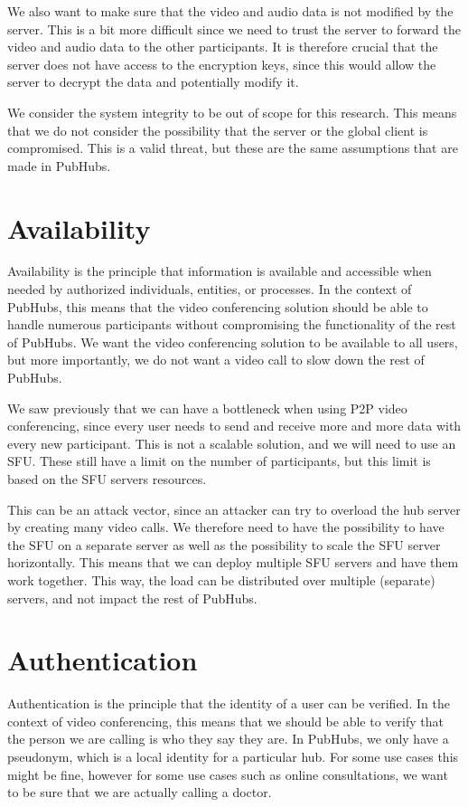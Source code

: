 \documentclass{report}
\begin{document}
We also want to make sure that the video and audio data is not modified by the server. This is a bit more difficult
since we need to trust the server to forward the video and audio data to the other participants. It is therefore crucial
that the server does not have access to the encryption keys, since this would allow the server to decrypt the data and
potentially modify it.

We consider the system integrity to be out of scope for this research. This means that we do not consider the
possibility that the server or the global client is compromised. This is a valid threat, but these are the same
assumptions
that are made in PubHubs.

\section{Availability}
Availability is the principle that information is available and accessible when needed by authorized individuals,
entities, or processes. In the context of PubHubs, this means that the video conferencing solution should be able to
handle numerous participants without compromising the functionality of the rest of PubHubs. We want the
video conferencing solution to be available to all users, but more importantly, we do not want a video call to slow
down the rest of PubHubs.

We saw previously that we can have a bottleneck when using P2P video conferencing, since every user needs to send
and receive more and more data with every new participant. This is not a scalable solution, and we will need to use
an SFU. These still have a limit on the number of participants, but this limit is based on the SFU servers resources.

This can be an attack vector, since an attacker can try to overload the hub server by creating many video
calls. We therefore need to have the possibility to have the SFU on a separate server as well as the possibility to
scale the SFU server horizontally. This means that we can deploy multiple SFU servers and have them work together.
This way, the load can be distributed over multiple (separate) servers, and not impact the rest of PubHubs.

\section{Authentication}
Authentication is the principle that the identity of a user can be verified. In the context of video conferencing,
this means that we should be able to verify that the person we are calling is who they say they are. In PubHubs, we
only have a pseudonym, which is a local identity for a particular hub. For some use cases this might be fine, however
for some use cases such as online consultations, we want to be sure that we are actually calling a doctor.
\end{document}
